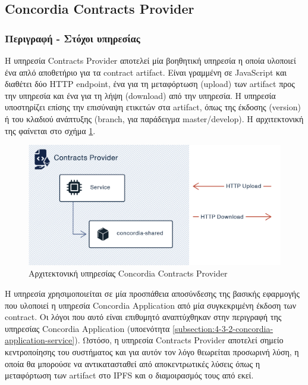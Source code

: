 \subsection{Concordia Contracts Provider} \label{subsection:4-3-5-concordia-contracts-provider-service}

\subsubsection{Περιγραφή - Στόχοι υπηρεσίας}

Η υπηρεσία Contracts Provider αποτελεί μία βοηθητική υπηρεσία η οποία υλοποιεί ένα απλό αποθετήριο για τα \textenglish{contract artifact}. Είναι γραμμένη σε JavaScript και διαθέτει δύο HTTP \textenglish{endpoint}, ένα για τη μεταφόρτωση (upload) των artifact προς την υπηρεσία και ένα για τη λήψη (download) από την υπηρεσία. Η υπηρεσία υποστηρίζει επίσης την επισύναψη ετικετών στα artifact, όπως της έκδοσης (version) ή του κλαδιού ανάπτυξης (branch, για παράδειγμα \textenglish{master/develop}). Η αρχιτεκτονική της φαίνεται στο σχήμα \ref{figure:4-3-concordia-contracts-provider-architecture}.

\vspace{.5\baselineskip}

\begin{figure}[H]
    \centering
    \includegraphics[width=.75\textwidth]{assets/figures/chapter-4/4.3.architecture-4.3.5.concordia-contracts-provider-architecture}
    \caption{Αρχιτεκτονική υπηρεσίας Concordia Contracts Provider}
    \label{figure:4-3-concordia-contracts-provider-architecture}
\end{figure}

Η υπηρεσία χρησιμοποιείται σε μία προσπάθεια αποσύνδεσης της βασικής εφαρμογής που υλοποιεί η υπηρεσία Concordia Application από μία συγκεκριμένη έκδοση των contract. Οι λόγοι που αυτό είναι επιθυμητό αναπτύχθηκαν στην περιγραφή της υπηρεσίας Concordia \textenglish{Application} (υποενότητα \ref{subsection:4-3-2-concordia-application-service}). Ωστόσο, η υπηρεσία Contracts Provider αποτελεί σημείο κεντροποίησης του συστήματος και για αυτόν τον λόγο θεωρείται προσωρινή λύση, η οποία θα μπορούσε να αντικατασταθεί από αποκεντρωτικές λύσεις όπως η μεταφόρτωση των artifact στο IPFS και ο διαμοιρασμός τους από εκεί.

